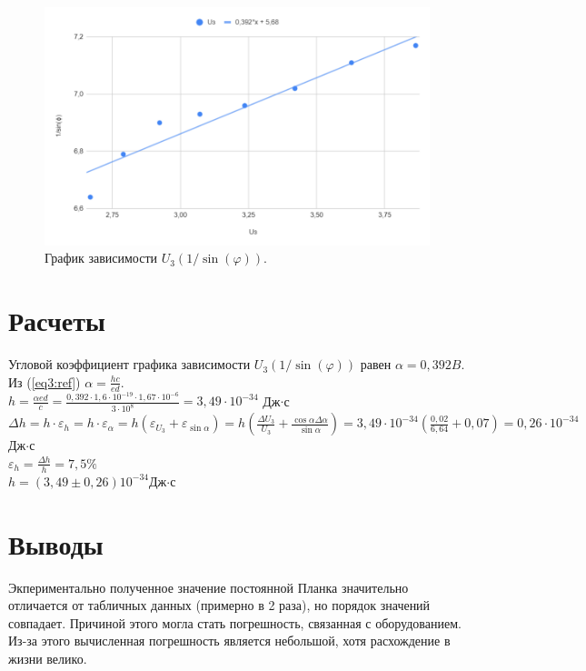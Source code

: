 \documentclass[12pt]{article}
\begin{document}
	\begin{figure}[H]
		\centering
		\includegraphics[width=0.9\linewidth]{graph3}
		\caption{График зависимости $U_3(1/\sin(\varphi))$.}
	\end{figure}
	\section{Расчеты}
	Угловой коэффициент графика зависимости $U_3(1/\sin(\varphi))$ равен $\alpha=0,392 B$. Из (\ref{eq3:ref}) $\displaystyle\alpha=\frac{hc}{ed}$.\\
	$
	\displaystyle
	h=\frac{\alpha ed}{c} = \frac{0,392\cdot 1,6 \cdot 10^{-19} \cdot 1,67 \cdot 10^{-6}}{3\cdot 10^8}=3,49\cdot 10^{-34} 
	$ Дж$\cdot$с\\
	$\displaystyle \Delta h=h\cdot \varepsilon_h=h\cdot\varepsilon_\alpha=h(\varepsilon_{U_3} + \varepsilon_{\sin\alpha})=h(\frac{\Delta{U_3}}{U_3} + \frac{\cos\alpha \Delta\alpha}{\sin\alpha})=3,49\cdot 10^{-34}(\frac{0,02}{6,64}+0,07)=0,26\cdot10^{-34}$Дж$\cdot$с\\
	$\varepsilon_h=\frac{\Delta h}{h}=7,5\%$\\
	$h = (3,49\pm0,26)10^{-34}$Дж$\cdot$с
	\section{Выводы}
	Экпериментально полученное значение постоянной Планка значительно отличается от табличных данных (примерно в 2 раза), но порядок значений совпадает. Причиной этого могла стать погрешность, связанная с оборудованием. Из-за этого вычисленная погрешность является небольшой, хотя расхождение в жизни велико.
\end{document}
